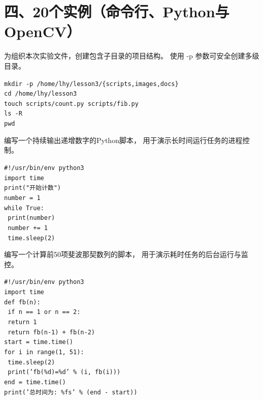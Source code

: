 \documentclass[a4paper, 12pt]{article}
\begin{document}
\section*{四、20个实例（命令行、Python与OpenCV）}

\begin{tcolorbox}[instancestyle, title=实例1：创建实验目录结构]
为组织本次实验文件，创建包含子目录的项目结构。
使用 -p 参数可安全创建多级目录。

\texttt{mkdir -p /home/lhy/lesson3/\{scripts,images,docs\}} \\
\texttt{cd /home/lhy/lesson3} \\
\texttt{touch scripts/count.py scripts/fib.py} \\
\texttt{ls -R} \\
\texttt{pwd}
\end{tcolorbox}

\begin{tcolorbox}[instancestyle, title=实例2：编写count.py（无限计数）]
编写一个持续输出递增数字的Python脚本，
用于演示长时间运行任务的进程控制。

\texttt{\#!/usr/bin/env python3} \\
\texttt{import time} \\
\texttt{print("开始计数")} \\
\texttt{number = 1} \\
\texttt{while True:} \\
\texttt{    print(number)} \\
\texttt{    number += 1} \\
\texttt{    time.sleep(2)}
\end{tcolorbox}

\begin{tcolorbox}[instancestyle, title=实例3：编写fib.py（斐波那契计算）]
编写一个计算前50项斐波那契数列的脚本，
用于演示耗时任务的后台运行与监控。

\texttt{\#!/usr/bin/env python3} \\
\texttt{import time} \\
\texttt{def fb(n):} \\
\texttt{    if n == 1 or n == 2:} \\
\texttt{        return 1} \\
\texttt{    return fb(n-1) + fb(n-2)} \\
\texttt{start = time.time()} \\
\texttt{for i in range(1, 51):} \\
\texttt{    time.sleep(2)} \\
\texttt{    print('fb(\%d)=\%d' \% (i, fb(i)))} \\
\texttt{end = time.time()} \\
\texttt{print('总时间为: \%fs' \% (end - start))}
\end{tcolorbox}
\end{document}
